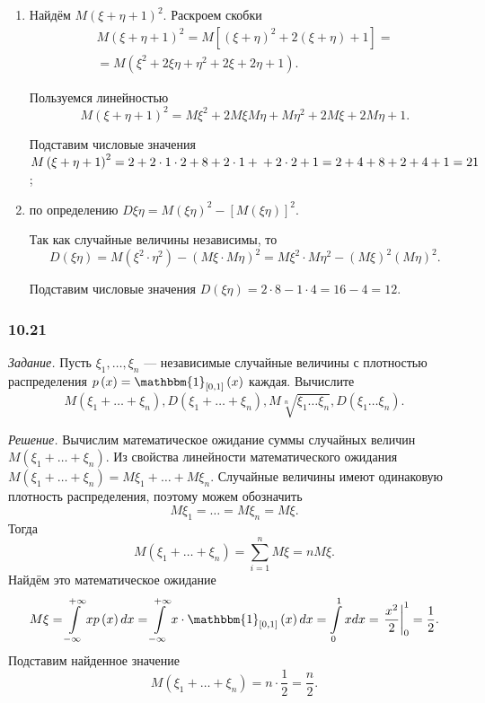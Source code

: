 \begin{enumerate}[label=\alph*)]
\item Найдём $M \left( \xi + \eta + 1 \right)^2$.
Раскроем скобки
\begin{equation*}
\begin{split}
M \left( \xi + \eta + 1 \right)^2 =
M \left[ \left( \xi + \eta \right)^2 + 2 \left( \xi + \eta \right) + 1 \right] = \\
= M \left( \xi^2 + 2 \xi \eta + \eta^2 + 2 \xi + 2 \eta + 1 \right).
\end{split}
\end{equation*}

Пользуемся линейностью
$$M \left( \xi + \eta + 1 \right)^2 =
M \xi^2 + 2 M \xi M \eta + M \eta^2 + 2M \xi + 2M \eta + 1.$$

Подставим числовые значения $M \left( \xi + \eta + 1 \right)^2 = 2 + 2 \cdot 1 \cdot 2 + 8 + 2 \cdot 1 + \\
+ 2 \cdot 2 + 1 = 2 + 4 + 8 + 2 + 4 + 1 = 21$;
\item по определению $D \xi \eta = M \left( \xi \eta \right)^2 - \left[ M \left( \xi \eta \right) \right]^2$.

Так как случайные величины независимы, то
$$D \left( \xi \eta \right) =
M \left( \xi^2 \cdot \eta^2 \right) - \left( M \xi \cdot M \eta \right)^2 =
M \xi^2 \cdot M \eta^2 - \left( M \xi \right)^2 \left( M \eta \right)^2.$$

Подставим числовые значения $D \left( \xi \eta \right) = 2 \cdot 8 - 1 \cdot 4 = 16 - 4 = 12$.
\end{enumerate}

\subsubsection*{10.21}

\textit{Задание.}
Пусть $ \xi_1, \dotsc, \xi_n$ ---
независимые случайные величины с плотностью распределения $p \left( x \right) = \mathbbm{1}_{ \left[ 0, 1 \right] } \left( x \right) $ каждая.
Вычислите
$$M \left( \xi_1 + \dotsc + \xi_n \right),
D \left( \xi_1 + \dotsc + \xi_n \right),
M \sqrt[n]{\xi_1 \dotsc \xi_n},
D \left( \xi_1 \dotsc \xi_n \right).$$

\textit{Решение.} Вычислим математическое ожидание суммы случайных величин $M \left( \xi_1 + \dotsc + \xi_n \right) $.
Из свойства линейности математического ожидания $M \left( \xi_1 + \dotsc + \xi_n \right) = M \xi_1 + \dotsc + M \xi_n$.
Случайные величины имеют одинаковую плотность распределения, поэтому можем обозначить
$$M \xi_1 =
\dotsc =
M \xi_n =
M \xi.$$
Тогда
$$M \left( \xi_1 + \dotsc + \xi_n \right) =
\sum \limits_{i=1}^n M \xi =
nM \xi.$$
Найдём это математическое ожидание
$$M \xi =
\int \limits_{- \infty }^{+ \infty } xp \left( x \right) dx =
\int \limits_{- \infty }^{+ \infty } x \cdot \mathbbm{1}_{ \left[ 0, 1 \right] } \left( x \right) dx =
\int \limits_0^1 xdx =
\left. \frac{x^2}{2} \right|_0^1 =
\frac{1}{2}.$$
Подставим найденное значение
$$M \left( \xi_1 + \dotsc + \xi_n \right) =
n \cdot \frac{1}{2} =
\frac{n}{2}.$$

